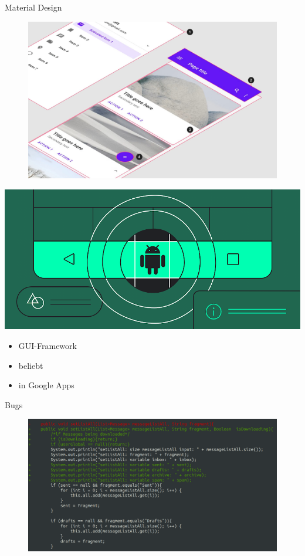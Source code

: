 \documentclass[aspectratio=169]{beamer}
\begin{document}
\begin{frame}[plain]{Material Design}
\begin{varwidth}{.5\textwidth}
        \begin{figure}
            \centering
            \includegraphics[width=\textwidth]{media/material-design-in-action.jpg}
        \end{figure}
    \end{varwidth}
    \hfill
    \begin{varwidth}{.4\textwidth}
        \includegraphics[width=\textwidth]{media/material-android.png}
        \begin{itemize}\pause
            \item GUI-Framework\pause
            \item beliebt\pause
            \item in Google Apps
        \end{itemize}
    \end{varwidth}
\end{frame}

\begin{frame}[plain]{Bugs}
    \begin{figure}[h]
        \includegraphics[width=.4\textwidth]{media/bug.png}
    \end{figure}
\end{frame}
\end{document}
